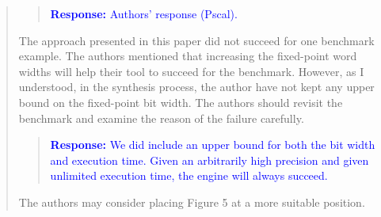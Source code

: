 \documentclass[11pt]{article}
\begin{document}
\begin{quote}
\begin{quote}
\textcolor{blue}{\textbf{Response:} Authors' response (Pscal).}
\end{quote}

The approach presented in this paper did not succeed for one benchmark example. The authors mentioned that increasing the fixed-point word widths will help their tool to succeed for the benchmark. However, as I understood, in the synthesis process, the author have not kept any upper bound on the fixed-point bit width. The authors should revisit the benchmark and examine the reason of the failure carefully.

\begin{quote}
\textcolor{blue}{\textbf{Response:} We did include an upper bound for both the
bit width and execution time. Given an arbitrarily high precision and given
unlimited execution time, the engine will always succeed.}
\end{quote}

The authors may consider placing Figure 5 at a more suitable position.

\end{quote}



\newpage
\end{document}
